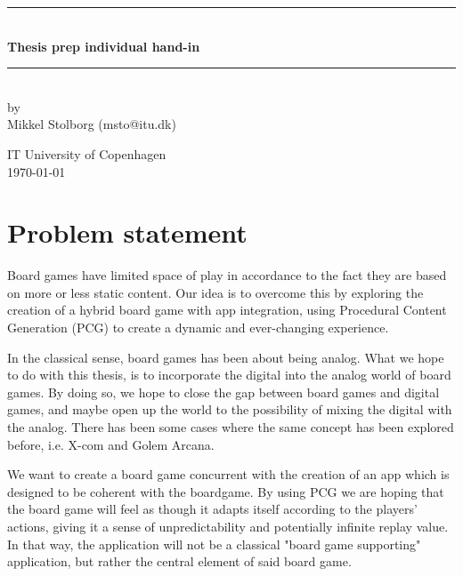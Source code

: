 \documentclass[a4paper,11pt]{article}
\begin{document}
\lstset{language=C}  
\begin{titlepage}

\centering \parindent=0pt
\newcommand{\HRule}{\rule{\textwidth}{1mm}}
 \HRule\\[1cm]\large\bfseries
Thesis prep individual hand-in\\[0.7cm]
\HRule\\[1cm]

\large by 
\\Mikkel Stolborg (msto@itu.dk)
 \normalsize
\begin{flushleft}
IT University of Copenhagen \\
\today \end{flushleft}
\end{titlepage}

\pagebreak
\section{Problem statement}
Board games have limited space of play in accordance to the fact they are based on more or less static content. Our idea is to overcome this by exploring the creation of a hybrid board game  with app integration, using Procedural Content Generation (PCG) to create a dynamic and ever-changing experience.

In the classical sense, board games has been about being analog. What we hope to do with this thesis, is to incorporate the digital into the analog world of board games. By doing so, we hope to close the gap between board games and digital games, and maybe open up the world to the possibility of mixing the digital with the analog. There has been some cases where the same concept has been explored before, i.e. X-com and Golem Arcana.

We want to create a board game concurrent with the creation of an app which is designed to be coherent with the boardgame. By using PCG we are hoping that the board game will feel as though it adapts itself according to the players' actions, giving it a sense of unpredictability and potentially infinite replay value. In that way, the application will not be a classical "board game supporting" application, but rather the central element of said board game.
\end{document}
